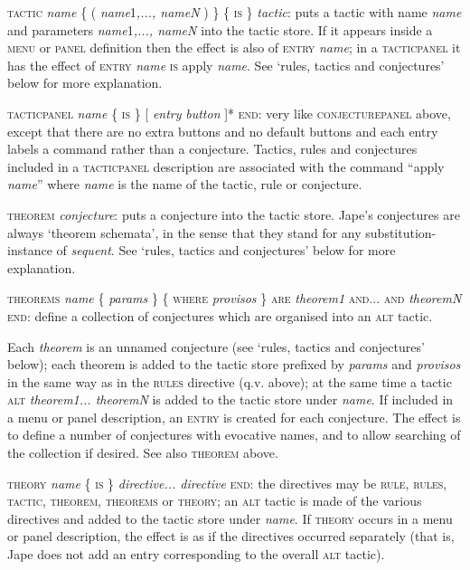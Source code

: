\textsc{tactic} \textit{name} \{ ( \textit{name}1\textit{,..., nameN} ) \} \{ \textsc{is \}} \textit{tactic}: puts a tactic with name \textit{name} and parameters \textit{name}1\textit{,..., nameN} into the tactic store. If it appears inside a \textsc{menu} or \textsc{panel} definition then the effect is also of \textsc{entry} \textit{name}; in a \textsc{tacticpanel} it has the effect of \textsc{entry} \textit{name} \textsc{is} apply \textit{name}. See `rules, tactics and conjectures' below for more explanation.


\textsc{tacticpanel} \textit{name} \{ \textsc{is} \} [ \textit{entry} {\textbar} \textit{button} ]* \textsc{end}: very like \textsc{conjecturepanel} above, except that there are no extra buttons and no default buttons and each entry labels a command rather than a conjecture. Tactics, rules and conjectures included in a \textsc{tacticpanel} description are associated with the command ``apply \textit{name}'' where \textit{name} is the name of the tactic, rule or conjecture.


\textsc{theorem} \textit{conjecture}: puts a conjecture into the tactic store. Jape's conjectures are always `theorem schemata', in the sense that they stand for any substitution-instance of \textit{sequent}. See `rules, tactics and conjectures' below for more explanation.


\textsc{theorems} \textit{name} \{ \textit{params} \} \{ \textsc{where} \textit{provisos} \} \textsc{are} \textit{theorem1} \textsc{and}... \textsc{and} \textit{theoremN} \textsc{end}: define a collection of conjectures which are organised into an \textsc{alt} tactic.


\tab Each \textit{theorem} is an unnamed conjecture (see `rules, tactics and conjectures' below); each theorem is added to the tactic store prefixed by \textit{params} and \textit{provisos} in the same way as in the \textsc{rules} directive (q.v. above); at the same time a tactic \textsc{alt} \textit{theorem1... theoremN} is added to the tactic store under \textit{name}. If included in a menu or panel description, an \textsc{entry} is created for each conjecture. The effect is to define a number of conjectures with evocative names, and to allow searching of the collection if desired. See also \textsc{theorem} above.


\textsc{theory} \textit{name} \{ \textsc{is} \} \textit{directive... directive} \textsc{end}: the directives may be \textsc{rule, rules, tactic, theorem, theorems} or \textsc{theory}; an \textsc{alt} tactic is made of the various directives and added to the tactic store under \textit{name}. If \textsc{theory} occurs in a menu or panel description, the effect is as if the directives occurred separately (that is, Jape does not add an entry corresponding to the overall \textsc{alt} tactic).


